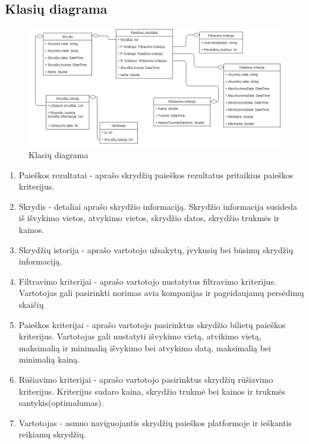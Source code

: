 \documentclass{VUMIFPSkursinis}
\begin{document}
            \subsection{Klasių diagrama}
                \begin{figure}[H]
                    \centering
                    \includegraphics[scale=0.6]{img/class_diagram}
                    \caption{Klasių diagrama}
                    \label{klasių diagrama}
                \end{figure}
                \begin{enumerate}[label=\textbf{E\arabic*}.]
                    \item Paieškos rezultatai - aprašo skrydžių paieškos rezultatus pritaikius paieškos kriterijus.
                    \item Skrydis - detaliai aprašo skrydžio informaciją. Skrydžio informacija susideda iš išvykimo vietos, atvykimo vietos, skrydžio datos, skrydžio trukmės ir kainos.
                    \item Skrydžių istorija - aprašo vartotojo užsakytų, įvykusių bei būsimų skrydžių informaciją.
                    \item Filtravimo kriterijai - aprašo vartotojo nustatytus filtravimo kriterijus. Vartotojas gali pasirinkti norimas avia kompanijas ir pageidaujamų persėdimų skaičių
                    \item Paieškos kriterijai - aprašo vartotojo pasirinktus skrydžio bilietų paieškos kriterijus. Vartotojas gali nustatyti išvykimo vietą, atvikimo vietą, maksimalią ir minimalią išvykimo bei atvykimo datą, maksimalią bei minimalią kainą.
                    \item Rūšiavimo kriterijai - aprašo vartotojo pasirinktus skrydžių rūšiavimo kriterijus. Kriterijus sudaro kaina, skrydžio trukmė bei kainos ir trukmės santykis(optimalumas).
                    \item Vartotojas - asmuo naviguojantis skrydžių paieškos platformoje ir ieškantis reikiamų skrydžių.
                \end{enumerate}
    
\end{document}
